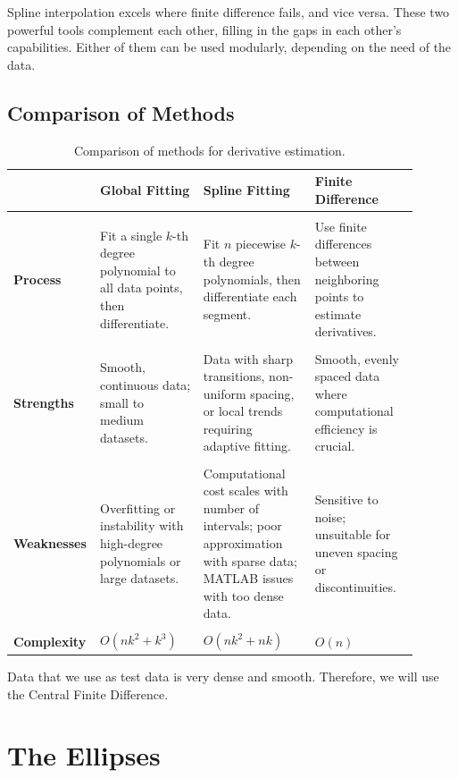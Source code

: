 \documentclass[a4paper]{article}
\begin{document}
Spline interpolation excels where finite difference fails, and vice versa. These two powerful tools complement each other, filling in the gaps in each other’s capabilities. Either of them can be used modularly, depending on the need of the data.
\pagebreak
\subsection{Comparison of Methods}
\begin{table}[ht]
    \centering
    \begin{tabular}{@{}p{0.13\linewidth}p{0.25\linewidth}p{0.27\linewidth}p{0.25\linewidth}@{}}
    \toprule \rule{0pt}{3ex}
    \textbf{} & \textbf{Global Fitting} & \textbf{Spline Fitting} & \textbf{Finite Difference} \rule[-2.5ex]{0pt}{0pt}\\
    \midrule\\
    \textbf{Process} & 
    Fit a single \( k \)-th degree polynomial to all data points, then differentiate. & 
    Fit \( n \) piecewise \( k \)-th degree polynomials, then differentiate each segment. & 
    Use finite differences between neighboring points to estimate derivatives. \\
    \\
    \textbf{Strengths} & 
    Smooth, continuous data; small to medium datasets. & 
    Data with sharp transitions, non-uniform spacing, or local trends requiring adaptive fitting. & 
    Smooth, evenly spaced data where computational efficiency is crucial. \\
    \\
    \textbf{Weaknesses} & 
    Overfitting or instability with high-degree polynomials or large datasets. & 
    Computational cost scales with number of intervals; poor approximation with sparse data; MATLAB issues with too dense data. & 
    Sensitive to noise; unsuitable for uneven spacing or discontinuities. \\
    \\
    \textbf{Complexity} & 
    \( O(nk^2 + k^3) \) & 
    \( O(nk^2 + nk) \) & 
   \( O(n) \)\rule[-2.5ex]{0pt}{0pt}\\
   \bottomrule 
    \end{tabular}
    \caption{Comparison of methods for derivative estimation.}
    \label{tab:comparison}
    \end{table}

Data that we use as test data is very dense and smooth. Therefore, we will use the Central Finite Difference.
\newpage
\hypertarget{the-ellipses}{%
\section{\texorpdfstring{The Ellipses}{ The Ellipses}}\label{the-ellipses}}
\end{document}
